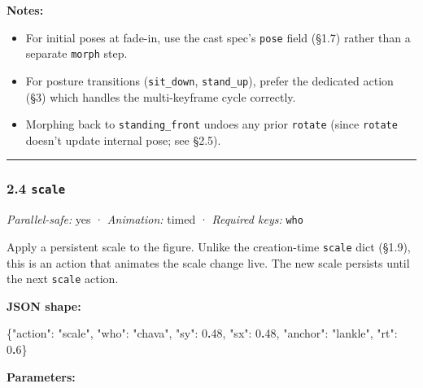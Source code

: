 \documentclass[
  11pt,
]{book}
\newenvironment{Shaded}{}{}
\newcommand{\DataTypeTok}[1]{\textcolor[rgb]{0.56,0.13,0.00}{#1}}
\newcommand{\DecValTok}[1]{\textcolor[rgb]{0.25,0.63,0.44}{#1}}
\newcommand{\ErrorTok}[1]{\textcolor[rgb]{1.00,0.00,0.00}{\textbf{#1}}}
\newcommand{\FunctionTok}[1]{\textcolor[rgb]{0.02,0.16,0.49}{#1}}
\newcommand{\StringTok}[1]{\textcolor[rgb]{0.25,0.44,0.63}{#1}}
\providecommand{\tightlist}{%
  \setlength{\itemsep}{0pt}\setlength{\parskip}{0pt}}
\begin{document}
\textbf{Notes:}

\begin{itemize}
\tightlist
\item
  For initial poses at fade-in, use the cast spec's \texttt{pose} field
  (§1.7) rather than a separate \texttt{morph} step.
\item
  For posture transitions (\texttt{sit\_down}, \texttt{stand\_up}),
  prefer the dedicated action (§3) which handles the multi-keyframe
  cycle correctly.
\item
  Morphing back to \texttt{standing\_front} undoes any prior
  \texttt{rotate} (since \texttt{rotate} doesn't update internal pose;
  see §2.5).
\end{itemize}

\begin{center}\rule{0.5\linewidth}{0.5pt}\end{center}

\subsubsection{\texorpdfstring{2.4
\texttt{scale}}{2.4 scale}}\label{scale-1}

\emph{Parallel-safe:} yes · \emph{Animation:} timed · \emph{Required
keys:} \texttt{who}

Apply a persistent scale to the figure. Unlike the creation-time
\texttt{scale} dict (§1.9), this is an action that animates the scale
change live. The new scale persists until the next \texttt{scale}
action.

\textbf{JSON shape:}

\begin{Shaded}
\begin{Highlighting}[]
\FunctionTok{\{}\DataTypeTok{"action"}\FunctionTok{:} \StringTok{"scale"}\FunctionTok{,} \DataTypeTok{"who"}\FunctionTok{:} \StringTok{"chava"}\FunctionTok{,} \DataTypeTok{"sy"}\FunctionTok{:} \DecValTok{0}\ErrorTok{.}\DecValTok{48}\FunctionTok{,} \DataTypeTok{"sx"}\FunctionTok{:} \DecValTok{0}\ErrorTok{.}\DecValTok{48}\FunctionTok{,}
 \DataTypeTok{"anchor"}\FunctionTok{:} \StringTok{"lankle"}\FunctionTok{,} \DataTypeTok{"rt"}\FunctionTok{:} \DecValTok{0}\ErrorTok{.}\DecValTok{6}\FunctionTok{\}}
\end{Highlighting}
\end{Shaded}

\textbf{Parameters:}
\end{document}
